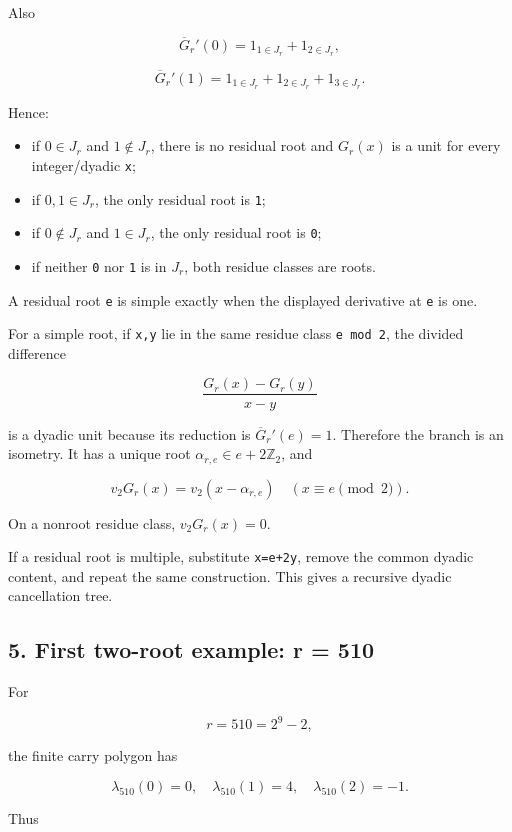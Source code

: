\documentclass[11pt,letterpaper]{article}
\providecommand{\tightlist}{\setlength{\itemsep}{0pt}\setlength{\parskip}{0pt}}
\begin{document}
Also

\[
\overline G_r'(0)=1_{1\in J_r}+1_{2\in J_r},
\]

\[
\overline G_r'(1)=1_{1\in J_r}+1_{2\in J_r}+1_{3\in J_r}.
\]

Hence:

\begin{itemize}
\tightlist
\item
  if \(0\in J_r\) and \(1\notin J_r\), there is no residual root and \(G_r(x)\) is a unit for every integer/dyadic \texttt{x};
\item
  if \(0,1\in J_r\), the only residual root is \texttt{1};
\item
  if \(0\notin J_r\) and \(1\in J_r\), the only residual root is \texttt{0};
\item
  if neither \texttt{0} nor \texttt{1} is in \(J_r\), both residue classes are roots.
\end{itemize}

A residual root \texttt{e} is simple exactly when the displayed derivative at \texttt{e} is one.

For a simple root, if \texttt{x,y} lie in the same residue class \texttt{e\ mod\ 2}, the divided difference

\[
\frac{G_r(x)-G_r(y)}{x-y}
\]

is a dyadic unit because its reduction is \(\overline G_r'(e)=1\). Therefore the branch is an isometry. It has a unique root \(\alpha_{r,e}\in e+2\mathbb Z_2\), and

\[
\boxed{
 v_2G_r(x)=v_2(x-\alpha_{r,e})
 \quad(x\equiv e\pmod2).
}
\]

On a nonroot residue class, \(v_2G_r(x)=0\).

If a residual root is multiple, substitute \texttt{x=e+2y}, remove the common dyadic content, and repeat the same construction. This gives a recursive dyadic cancellation tree.

\subsection{5. First two-root example: r = 510}\label{first-two-root-example-r-510}

For

\[
r=510=2^9-2,
\]

the finite carry polygon has

\[
\lambda_{510}(0)=0,
\quad
\lambda_{510}(1)=4,
\quad
\lambda_{510}(2)=-1.
\]

Thus
\end{document}
